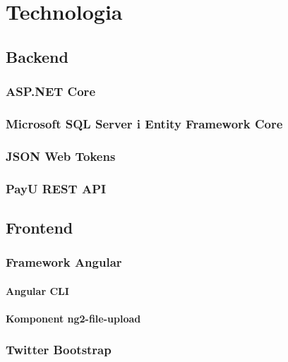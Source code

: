 \chapter{Technologia}

\section{Backend}
\subsection{ASP.NET Core}
\subsection{Microsoft SQL Server i Entity Framework Core}
\subsection{JSON Web Tokens}
\subsection{PayU REST API}

\section{Frontend}
\subsection{Framework Angular}
	\subsubsection{Angular CLI}
	\subsubsection{Komponent ng2-file-upload}

\subsection{Twitter Bootstrap}
